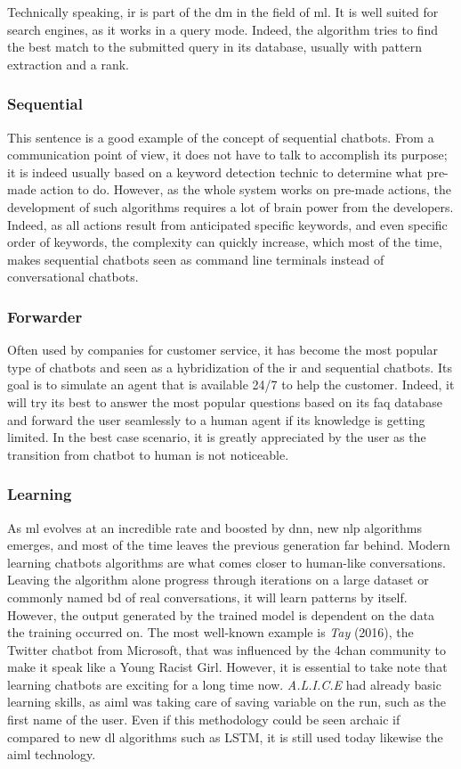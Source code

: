 Technically speaking, \gls{ir} is part of the \gls{dm} in the field of \gls{ml}. It is well suited for search engines, as it works in a query mode. Indeed, the algorithm tries to find the best match to the submitted query in its database, usually with pattern extraction and a rank. 

\subsubsection{Sequential}
This sentence is a good example of the concept of sequential chatbots. From a communication point of view, it does not have to talk to accomplish its purpose; it is indeed usually based on a keyword detection technic to determine what pre-made action to do. However, as the whole system works on pre-made actions, the development of such algorithms requires a lot of brain power from the developers. Indeed, as all actions result from anticipated specific keywords, and even specific order of keywords, the complexity can quickly increase, which most of the time, makes sequential chatbots seen as command line terminals instead of conversational chatbots.

\subsubsection{Forwarder}
Often used by companies for customer service, it has become the most popular type of chatbots and seen as a hybridization of the \gls{ir} and sequential chatbots. Its goal is to simulate an agent that is available 24/7 to help the customer. Indeed, it will try its best to answer the most popular questions based on its \gls{faq} database and forward the user seamlessly to a human agent if its knowledge is getting limited. In the best case scenario, it is greatly appreciated by the user as the transition from chatbot to human is not noticeable.

\subsubsection{Learning}
As \gls{ml} evolves at an incredible rate and boosted by \gls{dnn}, new \gls{nlp} algorithms emerges, and most of the time leaves the previous generation far behind. Modern learning chatbots algorithms are what comes closer to human-like conversations. Leaving the algorithm alone progress through iterations on a large dataset or commonly named \gls{bd} of real conversations, it will learn patterns by itself. However, the output generated by the trained model is dependent on the data the training occurred on. The most well-known example is \textit{Tay}\cite{chatbot:tay} (2016), the Twitter chatbot from Microsoft, that was influenced by the 4chan community to make it speak like a Young Racist Girl.
However, it is essential to take note that learning chatbots are exciting for a long time now. \textit{A.L.I.C.E}\cite{chatbot:alice} had already basic learning skills, as \gls{aiml} was taking care of saving variable on the run, such as the first name of the user. Even if this methodology could be seen archaic if compared to new \gls{dl} algorithms such as LSTM, it is still used today likewise the \gls{aiml} technology.


